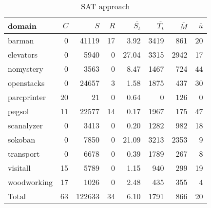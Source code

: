 \begin{table}[htbp]
\centering
\begingroup\small
\begin{tabular}{lrrrrrrr}
  \hline
domain & $C$ & $S$ & $R$ & $\overline{S_t}$ & $\overline{T_t}$ & $\overline{M}$ & $\overline{u}$ \\ 
  \hline
barman &   0 & 41119 &  17 & 3.92 & 3419 & 861 &  20 \\ 
  elevators &   0 & 5940 &   0 & 27.04 & 3315 & 2942 &  17 \\ 
  nomystery &   0 & 3563 &   0 & 8.47 & 1467 & 724 &  44 \\ 
  openstacks &   0 & 24657 &   3 & 1.58 & 1875 & 437 &  30 \\ 
  parcprinter &  20 &  21 &   0 & 0.64 &   0 & 126 &   0 \\ 
  pegsol &  11 & 22577 &  14 & 0.17 & 1967 & 175 &  47 \\ 
  scanalyzer &   0 & 3413 &   0 & 0.20 & 1282 & 982 &  18 \\ 
  sokoban &   0 & 7850 &   0 & 21.09 & 3213 & 2353 &   9 \\ 
  transport &   0 & 6678 &   0 & 0.39 & 1789 & 267 &   8 \\ 
  visitall &  15 & 5789 &   0 & 1.15 & 940 & 299 &  19 \\ 
  woodworking &  17 & 1026 &   0 & 2.48 & 435 & 355 &   4 \\ 
  Total &  63 & 122633 &  34 & 6.10 & 1791 & 866 &  20 \\ 
   \hline
\end{tabular}
\endgroup
\caption{SAT approach} 
\label{tab:sat}
\end{table}
